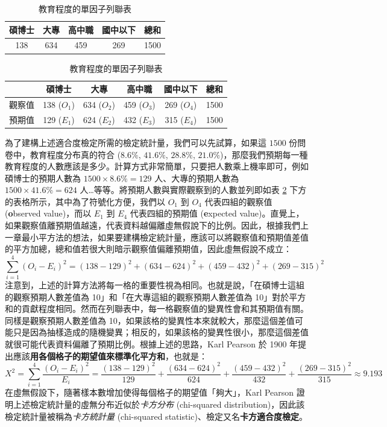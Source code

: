     \begin{table}[htbp]
        \begin{center}
            \begin{tabular}{cccc|c}
                \toprule
                碩博士 & 大專 & 高中職 & 國中以下 & 總和\\
                \hline
                138 & 634 & 459 & 269 & 1500\\
                \bottomrule
            \end{tabular}
            
            \bigskip
            
            \begin{tabular}{c|cccc|c}
                \toprule
                 & 碩博士 & 大專 & 高中職 & 國中以下 & 總和\\
                \hline
                觀察值 & 138 ($O_1$) & 634 ($O_2$) & 459 ($O_3$) & 269 ($O_4$) & 1500\\
                預期值 & 129 ($E_1$) & 624 ($E_2$) & 432 ($E_3$) & 315 ($E_4$) & 1500\\
                \bottomrule
            \end{tabular}
            \caption{教育程度的單因子列聯表\label{tab:one_way_contingency}}
        \end{center}
    \end{table}

    為了建構上述適合度檢定所需的檢定統計量，我們可以先試算，如果這 $1500$ 份問卷中，教育程度分布真的符合 ($8.6\%$, $41.6\%$, $28.8\%$, $21.0\%$)，那麼我們預期每一種教育程度的人數應該是多少。計算方式非常簡單，只要把人數乘上機率即可，例如碩博士的預期人數為 $1500 \times 8.6\% = 129$ 人、大專的預期人數為 $1500 \times 41.6\% = 624$ 人…等等。將預期人數與實際觀察到的人數並列即如表 \ref{tab:one_way_contingency} 下方的表格所示，其中為了符號化方便，我們以 $O_1$ 到 $O_4$ 代表四組的觀察值 (\textbf{o}bserved value)，而以 $E_1$ 到 $E_4$ 代表四組的預期值 (\textbf{e}xpected value)。直覺上，如果觀察值離預期值越遠，代表資料越偏離虛無假說下的比例。因此，根據我們上一章最小平方法的想法，如果要建構檢定統計量，應該可以將觀察值和預期值差值的平方加總，總和值若很大則暗示觀察值偏離預期值，因此虛無假說不成立：
    \smallskip
    \[\sum_{i=1}^4 (O_i - E_i)^2 = (138-129)^2 + (634-624)^2 + (459-432)^2 + (269-315)^2\]
    \smallskip
    注意到，上述的計算方法將每一格的重要性視為相同。也就是說，「在碩博士這組的觀察預期人數差值為 10」和「在大專這組的觀察預期人數差值為 10」對於平方和的貢獻程度相同。然而在列聯表中，每一格觀察值的變異性會和其預期值有關。同樣是觀察預期人數差值為 10，如果該格的變異性本來就較大，那麼這個差值可能只是因為抽樣造成的隨機變異；相反的，如果該格的變異性很小，那麼這個差值就很可能代表資料偏離了預期比例。根據上述的思路，Karl Pearson 於 1900 年提出應該\textbf{用各個格子的期望值來標準化平方和}，也就是：
    \smallskip
    \[X^2 = \sum_{i=1}^4 \frac{(O_i - E_i)^2}{E_i} = \frac{(138-129)^2}{129} + \frac{(634-624)^2}{624} + \frac{(459-432)^2}{432} + \frac{(269-315)^2}{315} \approx 9.193\]
    \smallskip
    在虛無假設下，隨著樣本數增加使得每個格子的期望值「夠大」，Karl Pearson 證明上述檢定統計量的虛無分布近似於\textit{卡方分布} (chi-squared distribution)，因此該檢定統計量被稱為\textit{卡方統計量} (chi-squared statistic)、檢定又名\textbf{卡方適合度檢定}。

